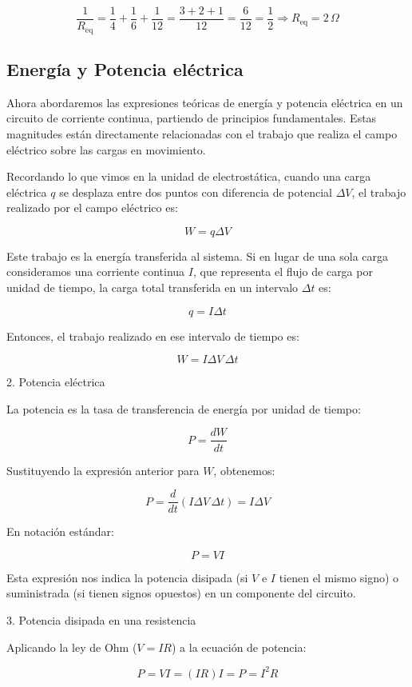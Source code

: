 \[
\frac{1}{R_{\text{eq}}} = \frac{1}{4} + \frac{1}{6} + \frac{1}{12} = \frac{3 + 2 + 1}{12} = \frac{6}{12} = \frac{1}{2}
\Rightarrow R_{\text{eq}} = 2 \, \Omega
\]

\subsection{Energía y Potencia eléctrica}

Ahora abordaremos las expresiones teóricas de energía y potencia eléctrica en un circuito de corriente continua, partiendo de principios fundamentales. Estas magnitudes están directamente relacionadas con el trabajo que realiza el campo eléctrico sobre las cargas en movimiento. 

Recordando lo que vimos en la unidad de electrostática, cuando una carga eléctrica \( q \) se desplaza entre dos puntos con diferencia de potencial \( \Delta V \), el trabajo realizado por el campo eléctrico es:

\[
W = q \Delta V
\]

Este trabajo es la energía transferida al sistema. Si en lugar de una sola carga consideramos una corriente continua \( I \), que representa el flujo de carga por unidad de tiempo, la carga total transferida en un intervalo \( \Delta t \) es:

\[
q = I \Delta t
\]

Entonces, el trabajo realizado en ese intervalo de tiempo es:

\[
W = I \Delta V \, \Delta t
\]


2. Potencia eléctrica

La potencia es la tasa de transferencia de energía por unidad de tiempo:

\[
P = \frac{dW}{dt}
\]

Sustituyendo la expresión anterior para \( W \), obtenemos:

\[
P = \frac{d}{dt}(I \Delta V \, \Delta t) = I \Delta V
\]

En notación estándar:

\[
\boxed{P = V I}
\]

Esta expresión nos indica la potencia disipada (si \( V \) e \( I \) tienen el mismo signo) o suministrada (si tienen signos opuestos) en un componente del circuito.


3. Potencia disipada en una resistencia

Aplicando la ley de Ohm (\( V = IR \)) a la ecuación de potencia:

\[
P = VI = (IR)I = \boxed{P = I^2 R}
\]

